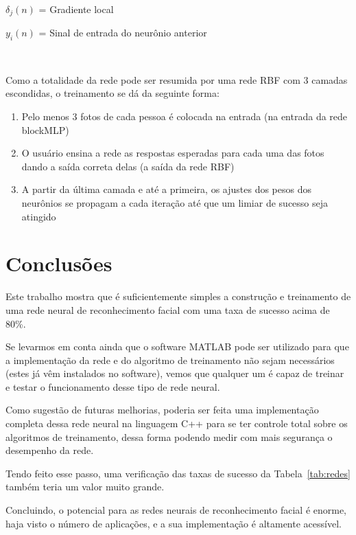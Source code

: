 \documentclass[hidelinks,11pt,twocolumn]{article}
\begin{document}
$\delta_{j}(n)$ = Gradiente local

$y_{i}(n)$ = Sinal de entrada do neurônio anterior

\


Como a totalidade da rede pode ser resumida por uma rede RBF com 3 camadas escondidas, o treinamento se dá da seguinte forma:

\begin{enumerate}
	\item Pelo menos 3 fotos de cada pessoa é colocada na entrada (na entrada da rede blockMLP)
	\item O usuário ensina a rede as respostas esperadas para cada uma das fotos dando a saída correta delas (a saída da rede RBF)
	\item A partir da última camada e até a primeira, os ajustes dos pesos dos neurônios se propagam a cada iteração até que um limiar de sucesso seja atingido
\end{enumerate}

\section{Conclusões}

Este trabalho mostra que é suficientemente simples a construção e treinamento de uma rede neural de reconhecimento facial com uma taxa de sucesso acima de 80\%. 

Se levarmos em conta ainda que o software MATLAB pode ser utilizado para que a implementação da rede e do algoritmo de treinamento não sejam necessários (estes já vêm instalados no software), vemos que qualquer um é capaz de treinar e testar o funcionamento desse tipo de rede neural.

Como sugestão de futuras melhorias, poderia ser feita uma implementação completa dessa rede neural na linguagem C++ para se ter controle total sobre os algoritmos de treinamento, dessa forma podendo medir com mais segurança o desempenho da rede.

Tendo feito esse passo, uma verificação das taxas de sucesso da Tabela~\ref{tab:redes} também teria um valor muito grande.

Concluindo, o potencial para as redes neurais de reconhecimento facial é enorme, haja visto o número de aplicações, e a sua implementação é altamente acessível.

\

\end{document}
